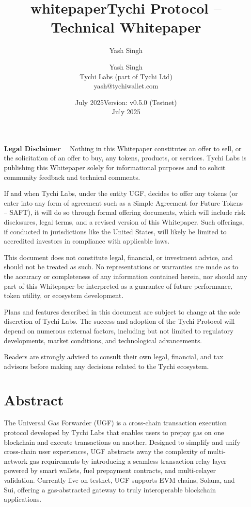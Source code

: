 \documentclass{article}
\title{whitepaper}
\author{Yash Singh}
\date{July 2025}
\title{Tychi Protocol – Technical Whitepaper}
\author{Yash Singh \\ Tychi Labs (part of Tychi Ltd) \\ yash@tychiwallet.com}
\date{Version: v0.5.0 (Testnet) \\ July 2025}
\begin{document}
\maketitle

\textbf{\footnotesize Legal Disclaimer}\scriptsize
~~Nothing in this Whitepaper constitutes an offer to sell, or the solicitation of an offer to buy, any tokens, products, or services. Tychi Labs is publishing this Whitepaper solely for informational purposes and to solicit community feedback and technical comments.

If and when Tychi Labs, under the entity UGF, decides to offer any tokens (or enter into any form of agreement such as a Simple Agreement for Future Tokens – SAFT), it will do so through formal offering documents, which will include risk disclosures, legal terms, and a revised version of this Whitepaper. Such offerings, if conducted in jurisdictions like the United States, will likely be limited to accredited investors in compliance with applicable laws.

This document does not constitute legal, financial, or investment advice, and should not be treated as such. No representations or warranties are made as to the accuracy or completeness of any information contained herein, nor should any part of this Whitepaper be interpreted as a guarantee of future performance, token utility, or ecosystem development.

Plans and features described in this document are subject to change at the sole discretion of Tychi Labs. The success and adoption of the Tychi Protocol will depend on numerous external factors, including but not limited to regulatory developments, market conditions, and technological advancements.

Readers are strongly advised to consult their own legal, financial, and tax advisors before making any decisions related to the Tychi ecosystem.

\section*{Abstract}

The Universal Gas Forwarder (UGF) is a cross-chain transaction execution protocol developed by Tychi Labs that enables users to prepay gas on one blockchain and execute transactions on another. Designed to simplify and unify cross-chain user experiences, UGF abstracts away the complexity of multi-network gas requirements by introducing a seamless transaction relay layer powered by smart wallets, fuel prepayment contracts, and multi-relayer validation. Currently live on testnet, UGF supports EVM chains, Solana, and Sui, offering a gas-abstracted gateway to truly interoperable blockchain applications.
\end{document}

